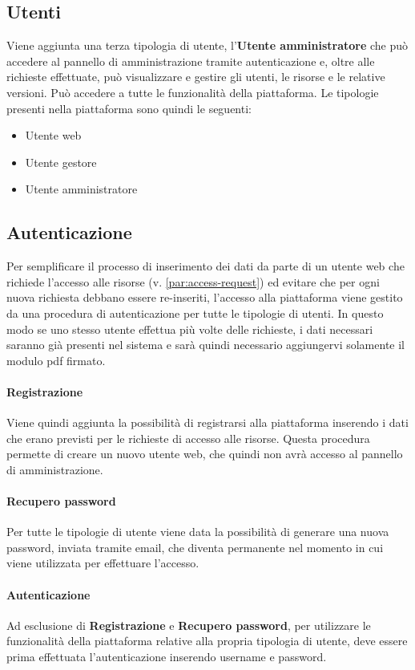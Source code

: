 \subsection{Utenti}
Viene aggiunta una terza tipologia di utente, l'\textbf{Utente amministratore}
che può accedere al pannello di amministrazione tramite autenticazione e, oltre
alle richieste effettuate, può visualizzare e gestire gli utenti, le risorse e
le relative versioni. Può accedere a tutte le funzionalità della piattaforma.
Le tipologie presenti nella piattaforma sono quindi le seguenti:
\begin{itemize}
	\item Utente web
	\item Utente gestore
	\item Utente amministratore
\end{itemize}


\subsection{Autenticazione} \label{subsec:authentication}
Per semplificare il processo di inserimento dei dati da parte di un utente web
che richiede l'accesso alle risorse (v. \ref{par:access-request}) ed evitare che
per ogni nuova richiesta debbano essere re-inseriti, l'accesso alla piattaforma
viene gestito da una procedura di autenticazione per tutte le tipologie di utenti.
In questo modo se uno stesso utente effettua più volte delle richieste, i dati
necessari saranno già presenti nel sistema e sarà quindi necessario aggiungervi
solamente il modulo pdf firmato.

\paragraph{Registrazione}
Viene quindi aggiunta la possibilità di registrarsi alla piattaforma inserendo i
dati che erano previsti per le richieste di accesso alle risorse. Questa procedura
permette di creare un nuovo utente web, che quindi non avrà accesso al pannello
di amministrazione.

\paragraph{Recupero password}
Per tutte le tipologie di utente viene data la possibilità di generare una nuova
password, inviata tramite email, che diventa permanente nel momento in cui
viene utilizzata per effettuare l'accesso.

\paragraph{Autenticazione}
Ad esclusione di \textbf{Registrazione} e \textbf{Recupero password}, per utilizzare
le funzionalità della piattaforma relative alla propria tipologia di utente,
deve essere prima effettuata l'autenticazione inserendo username e password.


